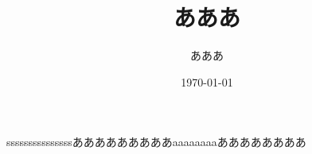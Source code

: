 \documentclass[a4paper,11pt]{jsarticle}
\begin{document}
\title{あああ}
\author{あああ}
\date{\today}
\maketitle


sssssssssssssssあああああああああaaaaaaaaああああああああ
\end{document}
